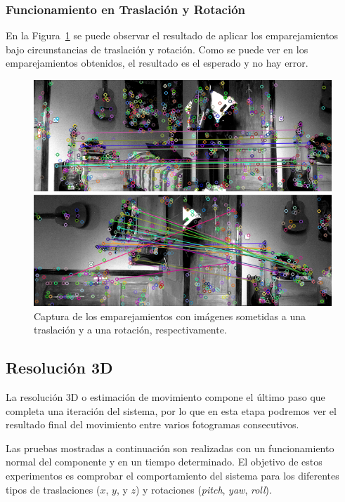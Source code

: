 \subsubsection{Funcionamiento en Traslación y Rotación}

En la Figura~\ref{fig:matching-rt} se puede observar el resultado de aplicar los emparejamientos bajo circunstancias de traslación y rotación. Como se puede ver en los emparejamientos obtenidos, el resultado es el esperado y no hay error.

\begin{figure}[th]
\centering
\includegraphics[scale=0.6]{Figures/tests/matching-rt.png}
\decoRule
\caption[Captura con los emparejamientos con imágenes sometidas a una rotación y a una traslación]{Captura de los emparejamientos con imágenes sometidas a una traslación y a una rotación, respectivamente.}
\label{fig:matching-rt}
\end{figure}

\subsection{Resolución 3D}

La resolución 3D o estimación de movimiento compone el último paso que completa una iteración del sistema, por lo que en esta etapa podremos ver el resultado final del movimiento entre varios fotogramas consecutivos.

Las pruebas mostradas a continuación son realizadas con un funcionamiento normal del componente y en un tiempo determinado. El objetivo de estos experimentos es comprobar el comportamiento del sistema para los diferentes tipos de traslaciones ($x$, $y$, y $z$) y rotaciones (\textit{pitch}, \textit{yaw}, \textit{roll}).

